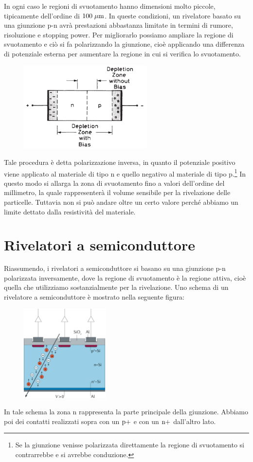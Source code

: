 In ogni caso le regioni di svuotamento hanno dimensioni molto piccole, tipicamente dell'ordine di $100 \; \rm \mu m$. In queste condizioni, un rivelatore basato su una giunzione p-n avrà prestazioni abbastanza limitate in termini di rumore, risoluzione e stopping power. Per migliorarlo possiamo ampliare la regione di svuotamento e ciò si fa polarizzando la giunzione, cioè applicando una differenza di potenziale esterna per aumentare la regione in cui si verifica lo svuotamento.
\begin{figure}[H]
   \centering
   \includegraphics[width=0.6\textwidth]{immagini/regione_svuotamento_ampliata.png}
\end{figure}
Tale procedura è detta polarizzazione inversa, in quanto il potenziale positivo viene applicato al materiale di tipo n e quello negativo al materiale di tipo p.\footnote{Se la giunzione venisse polarizzata direttamente la regione di svuotamento si contrarrebbe e si avrebbe conduzione.} In questo modo si allarga la zona di svuotamento fino a valori dell'ordine del millimetro, la quale rappresenterà il volume sensibile per la rivelazione delle particelle. Tuttavia non si può andare oltre un certo valore perché abbiamo un limite dettato dalla resistività del materiale.

\vfill

\section{Rivelatori a semiconduttore}
Riassumendo, i rivelatori a semiconduttore si basano su una giunzione p-n polarizzata inversamente, dove la regione di svuotamento è la regione attiva, cioè quella che utilizziamo sostanzialmente per la rivelazione. Uno schema di un rivelatore a semiconduttore è mostrato nella seguente figura:
\begin{figure}[H]
   \centering
   \includegraphics[width=0.4\textwidth]{immagini/rivelatore_a_semiconduttore.png}
\end{figure}
In tale schema la zona n rappresenta la parte principale della giunzione. Abbiamo poi dei contatti realizzati sopra con un $\rm p+$ e con un $\rm n+$ dall'altro lato.


